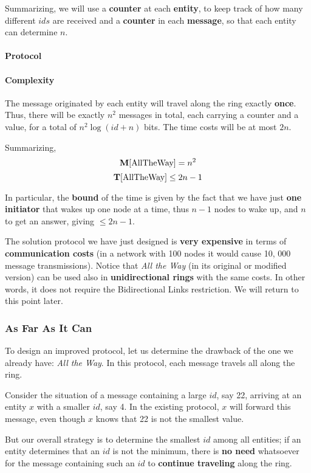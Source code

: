 Summarizing, we will use a \textbf{counter} at each \textbf{entity}, to keep track of how many different $ids$ are received and a \textbf{counter} in each \textbf{message}, so that each entity can determine $n$.

\paragraph{Protocol}

\paragraph{Complexity}
The message originated by each entity will travel along the ring exactly \textbf{once}. Thus, there will be exactly $n^2$ messages in total, each carrying a counter and a value, for a total of $n^2 \log(id + n)$ bits. The time costs will be at most $2n$. 

Summarizing,
$$\mathbf{M}[\text{AllTheWay}] = n^2$$ $$\mathbf{T}[\text{AllTheWay}] \leq 2n - 1$$

In particular, the \textbf{bound} of the time is given by the fact that we have just \textbf{one initiator} that wakes up one node at a time, thus $n-1$ nodes to wake up, and $n$ to get an answer, giving $\leq 2n-1$.

The solution protocol we have just designed is \textbf{very expensive} in terms of \textbf{communication costs} (in a network with 100 nodes it would cause 10, 000 message transmissions). Notice that \textit{All the Way} (in its original or modified version) can be used also in \textbf{unidirectional rings} with the same costs. In other words, it does not require the Bidirectional Links restriction. We will return to this point later.

\subsubsection{As Far As It Can}
To design an improved protocol, let us determine the drawback of the one we already have: \textit{All the Way}. In this protocol, each message travels all along the ring. 

Consider the situation of a message containing a large $id$, say 22, arriving at an entity $x$ with a smaller $id$, say 4. In the existing protocol, $x$ will forward this message, even though $x$ knows that 22 is not the smallest value. 

But our overall strategy is to determine the smallest $id$ among all entities; if an entity determines that an $id$ is not the minimum, there is \textbf{no need} whatsoever for the message containing such an $id$ to \textbf{continue traveling} along the ring. 

